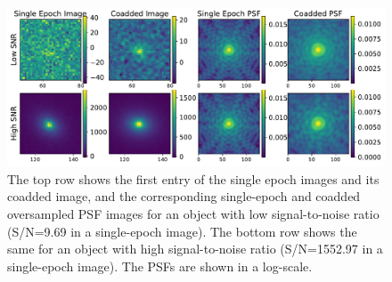 \documentclass[fleqn,usenatbib]{mnras}
\begin{document}
\begin{figure}
	\includegraphics[width=\textwidth]{lowsnr_highsnr_galaxies.pdf}
    \caption{The top row shows the first entry of the single epoch images and its coadded image, and the corresponding single-epoch and coadded oversampled PSF images for an object with low signal-to-noise ratio (S/N=9.69 in a single-epoch image). The bottom row shows the same for an object with high signal-to-noise ratio (S/N=1552.97 in a single-epoch image). The PSFs are shown in a log-scale.}
    \label{fig:singlecoadd}
\end{figure}
\end{document}
